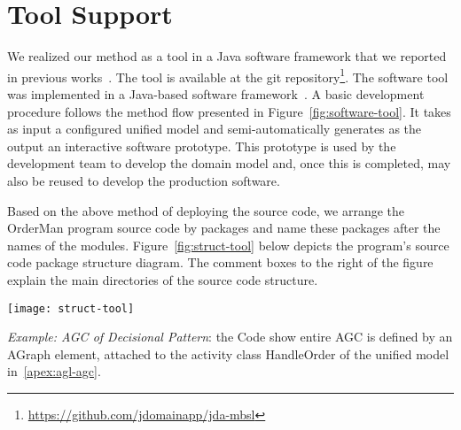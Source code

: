 \section{Tool Support}
\label{sect:tool} %
We realized our method as a tool in a Java software framework that we reported in previous works~\cite{le_domain_2018}. The tool is available at the git repository\footnote{\url{https://github.com/jdomainapp/jda-mbsl}}. The software tool was implemented in a Java-based software framework~\cite{le_jdomainapp_2017}. A basic development procedure follows the method flow presented in Figure~\ref{fig:software-tool}. It takes as input a configured unified model and semi-automatically generates as the output an interactive software prototype. This prototype is used by the development team to develop the domain model and, once this is completed, may also be reused to develop the production software.
%


Based on the above method of deploying the source code, we arrange the OrderMan program source code by packages and name these packages after the names of the modules. Figure~\ref{fig:struct-tool} below depicts the program's source code package structure diagram. The comment boxes to the right of the figure explain the main directories of the source code structure.
%
\begin{figure*}[ht]
	\centering
	\texttt{[image: struct-tool]}
	\caption{Structure diagram of the program source code} %
	\label{fig:struct-tool}
\end{figure*}
%

\textit{Example: AGC of Decisional Pattern}: the Code show entire AGC is defined by an AGraph element, attached to the activity class HandleOrder of the unified model in~\ref{apex:agl-agc}.


